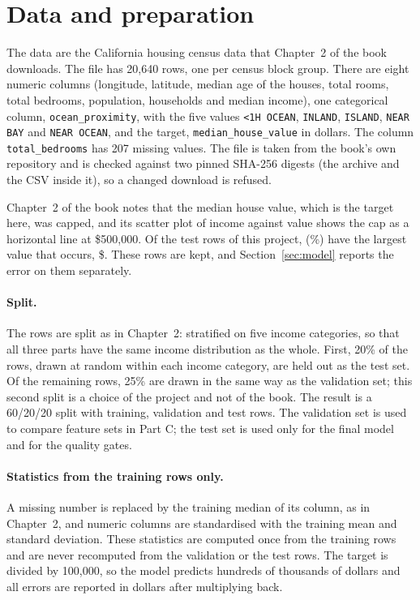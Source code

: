 \section{Data and preparation}
\label{sec:data}

The data are the California housing census data that Chapter~2 of the book downloads. The file has 20,640 rows, one per census block group. There are eight numeric columns (longitude, latitude, median age of the houses, total rooms, total bedrooms, population, households and median income), one categorical column, \texttt{ocean\_proximity}, with the five values \texttt{<1H OCEAN}, \texttt{INLAND}, \texttt{ISLAND}, \texttt{NEAR BAY} and \texttt{NEAR OCEAN}, and the target, \texttt{median\_house\_value} in dollars. The column \texttt{total\_bedrooms} has 207 missing values. The file is taken from the book's own repository and is checked against two pinned SHA-256 digests (the archive and the CSV inside it), so a changed download is refused.

Chapter~2 of the book notes that the median house value, which is the target here, was capped, and its scatter plot of income against value shows the cap as a horizontal line at \$500,000. Of the \runSplitNTest{} test rows of this project,  (\%) have the largest value that occurs, \$. These rows are kept, and Section~\ref{sec:model} reports the error on them separately.

\paragraph{Split.} The rows are split as in Chapter~2: stratified on five income categories, so that all three parts have the same income distribution as the whole. First, 20\% of the rows, drawn at random within each income category, are held out as the test set. Of the remaining rows, 25\% are drawn in the same way as the validation set; this second split is a choice of the project and not of the book. The result is a 60/20/20 split with \runSplitNTrain{} training, \runSplitNValid{} validation and \runSplitNTest{} test rows. The validation set is used to compare feature sets in Part C; the test set is used only for the final model and for the quality gates.

\paragraph{Statistics from the training rows only.} A missing number is replaced by the training median of its column, as in Chapter~2, and numeric columns are standardised with the training mean and standard deviation. These statistics are computed once from the training rows and are never recomputed from the validation or the test rows. The target is divided by 100,000, so the model predicts hundreds of thousands of dollars and all errors are reported in dollars after multiplying back.

